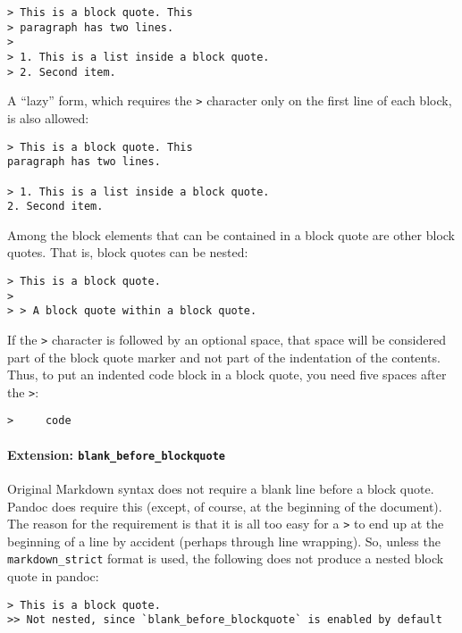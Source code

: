 \begin{verbatim}
> This is a block quote. This
> paragraph has two lines.
>
> 1. This is a list inside a block quote.
> 2. Second item.
\end{verbatim}

A ``lazy'' form, which requires the \texttt{\textgreater{}} character
only on the first line of each block, is also allowed:

\begin{verbatim}
> This is a block quote. This
paragraph has two lines.

> 1. This is a list inside a block quote.
2. Second item.
\end{verbatim}

Among the block elements that can be contained in a block quote are
other block quotes. That is, block quotes can be nested:

\begin{verbatim}
> This is a block quote.
>
> > A block quote within a block quote.
\end{verbatim}

If the \texttt{\textgreater{}} character is followed by an optional
space, that space will be considered part of the block quote marker and
not part of the indentation of the contents. Thus, to put an indented
code block in a block quote, you need five spaces after the
\texttt{\textgreater{}}:

\begin{verbatim}
>     code
\end{verbatim}

\hypertarget{extension-blank_before_blockquote}{%
\paragraph{\texorpdfstring{Extension:
\texttt{blank\_before\_blockquote}}{Extension: blank\_before\_blockquote}}\label{extension-blank_before_blockquote}}

Original Markdown syntax does not require a blank line before a block
quote. Pandoc does require this (except, of course, at the beginning of
the document). The reason for the requirement is that it is all too easy
for a \texttt{\textgreater{}} to end up at the beginning of a line by
accident (perhaps through line wrapping). So, unless the
\texttt{markdown\_strict} format is used, the following does not produce
a nested block quote in pandoc:

\begin{verbatim}
> This is a block quote.
>> Not nested, since `blank_before_blockquote` is enabled by default
\end{verbatim}

